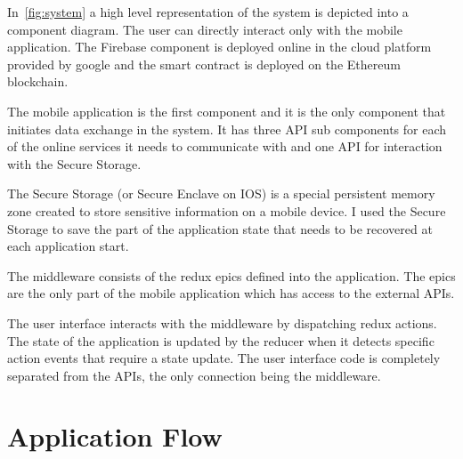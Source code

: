 \documentclass[a4paper,12pt]{report}
\begin{document}
In~\autoref{fig:system} a high level representation of the system is depicted
into a component diagram. The user can directly interact only with the mobile
application. The Firebase component is deployed online in the cloud platform
provided by google and the smart contract is deployed on the Ethereum
blockchain.

The mobile application is the first component and it is the only component that
initiates data exchange in the system. It has three API sub components for each
of the online services it needs to communicate with and one API for interaction
with the Secure Storage.

The Secure Storage (or Secure Enclave on IOS) is a special persistent memory
zone created to store sensitive information on a mobile device. I used the
Secure Storage to save the part of the application state that needs to be
recovered at each application start.

The middleware consists of the redux epics defined into the application. The
epics are the only part of the mobile application which has access to the
external APIs.

The user interface interacts with the middleware by dispatching redux actions.
The state of the application is updated by the reducer when it detects specific
action events that require a state update. The user interface code is
completely separated from the APIs, the only connection being the middleware.

\section{Application Flow}
\end{document}
